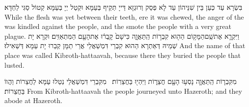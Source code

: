 {בִּשְׂרָא עַד כְּעַן בֵּין שִׁנֵּיהוֹן עַד לָא פְסַק וְרוּגְזָא דַּייָ תְּקֵיף בְּעַמָּא וּקְטַל יְיָ בְּעַמָּא קְטוֹל סַגִּי לַחְדָּא׃}
{While the flesh was yet between their teeth, ere it was chewed, the anger of the \lord\space was kindled against the people, and the \lord\space smote the people with a very great plague.}{}
{וַיִּקְרָ֛א אֶת\maqqaf שֵֽׁם\maqqaf הַמָּק֥וֹם הַה֖וּא קִבְר֣וֹת הַֽתַּאֲוָ֑ה כִּי\maqqaf שָׁם֙ קָֽבְר֔וּ אֶת\maqqaf הָעָ֖ם הַמִּתְאַוִּֽים׃}
{וּקְרָא יָת שְׁמֵיהּ דְּאַתְרָא הַהוּא קִבְרֵי דִּמְשַׁאֲלֵי אֲרֵי תַמָּן קְבַרוּ יָת עַמָּא דְּשַׁאִילוּ׃}
{And the name of that place was called Kibroth-hattaavah, because there they buried the people that lusted.}{}

{מִקִּבְר֧וֹת הַֽתַּאֲוָ֛ה נָסְע֥וּ הָעָ֖ם חֲצֵר֑וֹת וַיִּהְי֖וּ בַּחֲצֵרֽוֹת׃ \petucha }
{מִקִּבְרֵי דִּמְשַׁאֲלֵי נְטַלוּ עַמָּא לַחֲצֵרוֹת וַהֲווֹ בַּחֲצֵרוֹת׃}
{From Kibroth-hattaavah the people journeyed unto Hazeroth; and they abode at Hazeroth.}{}

